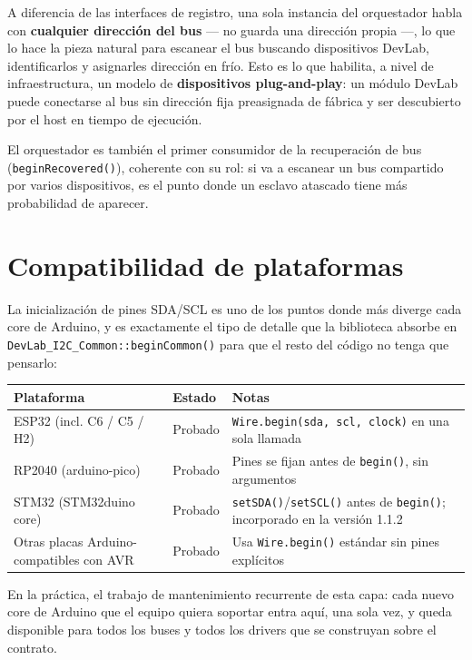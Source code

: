 \documentclass[11pt,a4paper]{article}
\newcommand{\code}[1]{\texttt{\small #1}}
\begin{document}
A diferencia de las interfaces de registro, una sola instancia del orquestador habla con \textbf{cualquier dirección del bus} --- no guarda una dirección propia ---, lo que lo hace la pieza natural para escanear el bus buscando dispositivos DevLab, identificarlos y asignarles dirección en frío. Esto es lo que habilita, a nivel de infraestructura, un modelo de \textbf{dispositivos plug-and-play}: un módulo DevLab puede conectarse al bus sin dirección fija preasignada de fábrica y ser descubierto por el host en tiempo de ejecución.

El orquestador es también el primer consumidor de la recuperación de bus (\code{beginRecovered()}), coherente con su rol: si va a escanear un bus compartido por varios dispositivos, es el punto donde un esclavo atascado tiene más probabilidad de aparecer.

\section*{Compatibilidad de plataformas}

La inicialización de pines SDA/SCL es uno de los puntos donde más diverge cada core de Arduino, y es exactamente el tipo de detalle que la biblioteca absorbe en \code{DevLab\_I2C\_Common::beginCommon()} para que el resto del código no tenga que pensarlo:

\begin{center}
\begin{tabularx}{\textwidth}{@{} >{\raggedright\arraybackslash}p{4.1cm} >{\raggedright\arraybackslash}p{1.9cm} X @{}}
\toprule
\textbf{Plataforma} & \textbf{Estado} & \textbf{Notas} \\
\midrule
ESP32 (incl. C6 / C5 / H2) & Probado & \code{Wire.begin(sda, scl, clock)} en una sola llamada \\[0.4em]
RP2040 (arduino-pico) & Probado & Pines se fijan antes de \code{begin()}, sin argumentos \\[0.4em]
STM32 (STM32duino core) & Probado & \code{setSDA()}/\code{setSCL()} antes de \code{begin()}; incorporado en la versión 1.1.2 \\[0.4em]
Otras placas Arduino-compatibles con AVR & Probado & Usa \code{Wire.begin()} estándar sin pines explícitos \\
\bottomrule
\end{tabularx}
\end{center}

En la práctica, el trabajo de mantenimiento recurrente de esta capa: cada nuevo core de Arduino que el equipo quiera soportar entra aquí, una sola vez, y queda disponible para todos los buses y todos los drivers que se construyan sobre el contrato.
\end{document}
